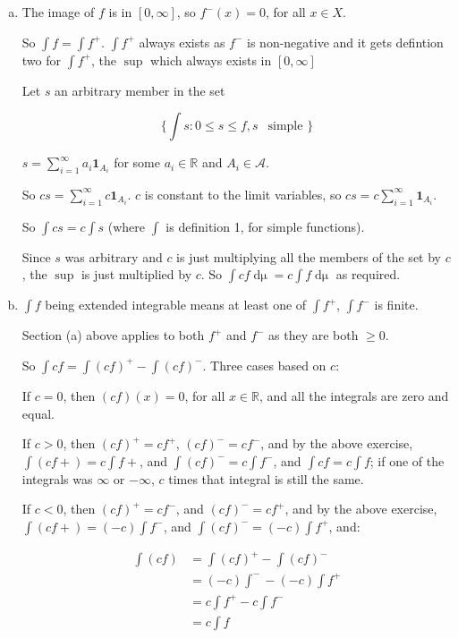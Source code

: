 \documentclass[11pt,oneside]{article}
\numberwithin{equation}{section}
\theoremstyle{definition}
\def\RR{\mathbb{R}}
\def\fancyA{\mathscr{A}}
\def\one{\mathbf{1}}
\begin{document}
\begin{solution}
  \begin{enumerate}[(a)]
  \item
    The image of $f$ is in $[0, \infty]$, so $f^-(x) = 0$, for all $x \in X$.
    
    So $\int f = \int f^+$.  $\int f^+$ always exists as $f^-$ is non-negative and it gets
    defintion two for $\int f^+$, the $\sup$ which always exists in $[0, \infty]$
    
    Let $s$ an arbitrary member in the set
    
    \[
    \{  \int s : 0 \leq s \leq f, s \ \  \textrm{ simple } \}
    \]
    
    $ s = \sum \limits_{i = 1}^\infty a_i \one_{A_i} $ for some $a_i \in \RR$ and $A_i \in \fancyA$.
    
    So $cs = \sum \limits_{i = 1} ^ \infty c \one_{A_i}$.  $c$ is constant to the limit variables,
    so $cs = c \sum \limits_{i=1} ^ \infty \one_{A_i}$.
    
    So $\int cs = c \int s$ (where $\int$ is definition 1, for simple functions).
    
    Since $s$ was arbitrary and $c$ is just multiplying all the members of the set by $c$,
    the $\sup$ is just multiplied by $c$.  So $\int cf \mathop{d \mu} = c \int f \mathop{d \mu}$ as required.  
    
    
    
  \item
    $\int f$ being extended integrable means at least one of $\int f^+$, $\int f^-$ is finite.
    
    Section (a) above applies to both $f^+$ and $f^-$ as they are both $ \geq 0$.
    
    So $\int cf = \int (cf)^+ - \int(cf)^-$.  Three cases based on $c$:
    
    If $c = 0$, then $(cf)(x) = 0$, for all $x \in \RR$, and all the integrals are zero and equal.
    
    If $c > 0$, then $(cf)^+ = cf^+$, $(cf)^- = cf^-$, and by the above exercise,
    $\int (cf+) = c \int f+$, and $\int (cf)^- = c \int f^-$, and $\int cf = c \int f$; if one
    of the integrals was $\infty$ or $- \infty$, $c$ times that integral is still the same.
    
    If $c < 0$, then $(cf)^+ = cf^-$, and $(cf)^- = cf^+$, and by the
    above exercise, $\int (cf+) = (-c) \int f^-$,
    and $\int (cf)^- = (-c) \int f^+$, and:
    
    \begin{align*}
      \int (cf) & = \int(cf) ^ + - \int(cf)^- \\
      & = (-c) \int^- - (-c) \int f^+ \\
      & = c \int f^+ - c \int f^- \\
      & = c \int f
    \end{align*}
    

\end{enumerate}
\end{solution}
\end{document}
